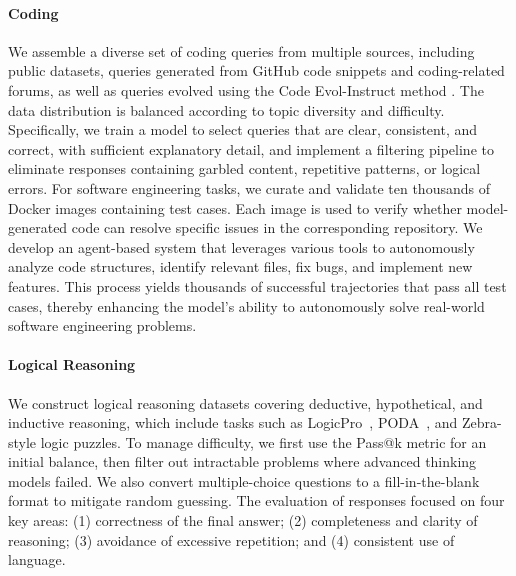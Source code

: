 \documentclass{article}
\begin{document}
\paragraph{Coding}

We assemble a diverse set of coding queries from multiple sources, including public datasets, queries generated from GitHub code snippets \citep{SelfCodeAlign_nips} and coding-related forums, as well as queries evolved using the Code Evol-Instruct method \citep{WizardCoder_iclr}. The data distribution is balanced according to topic diversity and difficulty. Specifically, we train a model to select queries that are clear, consistent, and correct, with sufficient explanatory detail, and implement a filtering pipeline to eliminate responses containing garbled content, repetitive patterns, or logical errors. For software engineering tasks, we curate and validate ten thousands of Docker images containing test cases. Each image is used to verify whether model-generated code can resolve specific issues in the corresponding repository. We develop an agent-based system that leverages various tools to autonomously analyze code structures, identify relevant files, fix bugs, and implement new features. This process yields thousands of successful trajectories that pass all test cases, thereby enhancing the model’s ability to autonomously solve real-world software engineering problems.

\paragraph{Logical Reasoning}


We construct logical reasoning datasets covering deductive, hypothetical, and inductive reasoning, which include tasks such as LogicPro~\citep{jiang-etal-2025-logicpro}, PODA~\citep{wang2025PODA}, and Zebra-style logic puzzles. To manage difficulty, we first use the Pass@k metric for an initial balance, then filter out intractable problems where advanced thinking models failed. We also convert multiple-choice questions to a fill-in-the-blank format to mitigate random guessing. The evaluation of responses focused on four key areas: (1) correctness of the final answer; (2) completeness and clarity of reasoning; (3) avoidance of excessive repetition; and (4) consistent use of language.
\end{document}
